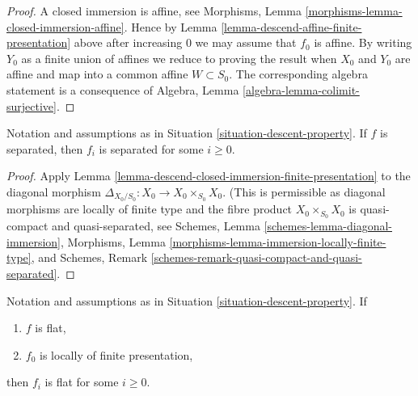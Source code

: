 \begin{proof}
A closed immersion is affine, see
Morphisms, Lemma \ref{morphisms-lemma-closed-immersion-affine}.
Hence by Lemma \ref{lemma-descend-affine-finite-presentation} above
after increasing $0$ we may assume that $f_0$ is affine.
By writing $Y_0$ as a finite union of affines we reduce to proving
the result when $X_0$ and $Y_0$ are affine and map
into a common affine $W \subset S_0$. The corresponding algebra
statement is a consequence of
Algebra, Lemma \ref{algebra-lemma-colimit-surjective}.
\end{proof}

\begin{lemma}
\label{lemma-descend-separated-finite-presentation}
Notation and assumptions as in Situation \ref{situation-descent-property}.
If $f$ is separated, then $f_i$ is separated for some $i \geq 0$.
\end{lemma}

\begin{proof}
Apply Lemma \ref{lemma-descend-closed-immersion-finite-presentation}
to the diagonal morphism $\Delta_{X_0/S_0} : X_0 \to X_0 \times_{S_0} X_0$.
(This is permissible as diagonal morphisms are locally of finite type
and the fibre product $X_0 \times_{S_0} X_0$ is quasi-compact and
quasi-separated, see
Schemes, Lemma \ref{schemes-lemma-diagonal-immersion},
Morphisms, Lemma \ref{morphisms-lemma-immersion-locally-finite-type}, and
Schemes, Remark \ref{schemes-remark-quasi-compact-and-quasi-separated}.
\end{proof}

\begin{lemma}
\label{lemma-descend-flat-finite-presentation}
Notation and assumptions as in Situation \ref{situation-descent-property}.
If
\begin{enumerate}
\item $f$ is flat,
\item $f_0$ is locally of finite presentation,
\end{enumerate}
then $f_i$ is flat for some $i \geq 0$.
\end{lemma}

